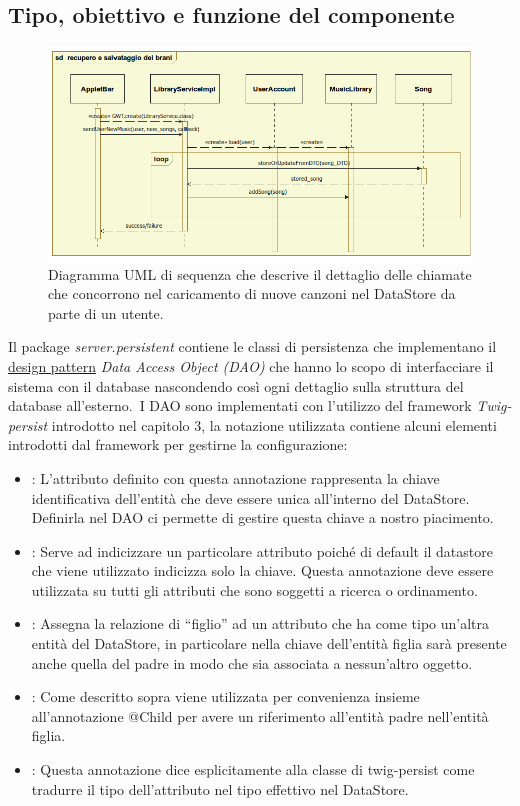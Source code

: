 \subsection*{Tipo, obiettivo e funzione del componente}
\begin{figure}[!h]
  \centering
  \includegraphics[width=17cm]{img/DP/sequences.png}
\caption{Diagramma UML di sequenza che descrive il dettaglio delle chiamate
che concorrono nel caricamento di nuove canzoni nel DataStore da parte di un
utente.}
\end{figure}
Il package \emph{server.persistent} contiene le classi di persistenza che
implementano il \underline{design pattern} \emph{Data Access Object (DAO)} che
hanno lo scopo di interfacciare il sistema con il database nascondendo cos\`i ogni
dettaglio sulla struttura del database all'esterno.\
I DAO sono implementati con l'utilizzo del framework \emph{Twig-persist}
introdotto nel capitolo 3, la notazione utilizzata contiene alcuni elementi
introdotti dal framework per gestirne la configurazione: 
\begin{itemize}
  \item {}: L'attributo definito con questa annotazione rappresenta la
  chiave identificativa dell'entit\`a che deve essere unica all'interno del
  DataStore. Definirla nel DAO ci permette di gestire questa chiave a nostro
  piacimento.
  \item {}: Serve ad indicizzare un particolare attributo poich\'e di
  default il datastore che viene utilizzato indicizza solo la chiave. Questa
  annotazione deve essere utilizzata su tutti gli attributi che sono soggetti a
  ricerca o ordinamento.
  \item {}: Assegna la relazione di ``figlio'' ad un attributo
  che ha come tipo un'altra entit\`a del DataStore, in particolare nella chiave
  dell'entit\`a figlia sar\`a presente anche quella del padre in modo che sia
  associata a nessun'altro oggetto.
  \item {}: Come descritto sopra viene utilizzata per convenienza
  insieme all'annotazione @Child per avere un riferimento all'entit\`a padre
  nell'entit\`a figlia.
  \item {}: Questa annotazione dice esplicitamente alla
  classe di twig-persist \co{ObjectFieldTraslator} come tradurre il tipo dell'attributo
  nel tipo effettivo nel DataStore.
\end{itemize}
